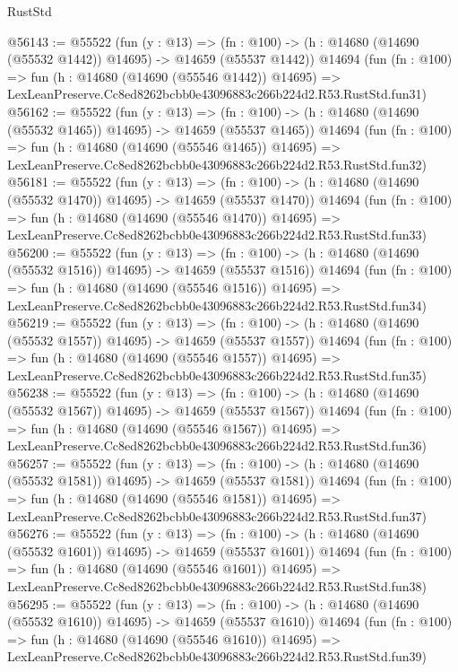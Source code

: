 \begin{lexlean}{RustStd}
\begin{coremodule}
@56143 := @55522
    (fun (y : @13) =>
    (fn : @100) -> (h : @14680 (@14690 (@55532 @1442)) @14695) -> @14659 (@55537 @1442))
    @14694
    (fun (fn : @100) =>
    fun (h : @14680 (@14690 (@55546 @1442)) @14695) =>
    LexLeanPreserve.Cc8ed8262bcbb0e43096883c266b224d2.R53.RustStd.fun31)
@56162 := @55522
    (fun (y : @13) =>
    (fn : @100) -> (h : @14680 (@14690 (@55532 @1465)) @14695) -> @14659 (@55537 @1465))
    @14694
    (fun (fn : @100) =>
    fun (h : @14680 (@14690 (@55546 @1465)) @14695) =>
    LexLeanPreserve.Cc8ed8262bcbb0e43096883c266b224d2.R53.RustStd.fun32)
@56181 := @55522
    (fun (y : @13) =>
    (fn : @100) -> (h : @14680 (@14690 (@55532 @1470)) @14695) -> @14659 (@55537 @1470))
    @14694
    (fun (fn : @100) =>
    fun (h : @14680 (@14690 (@55546 @1470)) @14695) =>
    LexLeanPreserve.Cc8ed8262bcbb0e43096883c266b224d2.R53.RustStd.fun33)
@56200 := @55522
    (fun (y : @13) =>
    (fn : @100) -> (h : @14680 (@14690 (@55532 @1516)) @14695) -> @14659 (@55537 @1516))
    @14694
    (fun (fn : @100) =>
    fun (h : @14680 (@14690 (@55546 @1516)) @14695) =>
    LexLeanPreserve.Cc8ed8262bcbb0e43096883c266b224d2.R53.RustStd.fun34)
@56219 := @55522
    (fun (y : @13) =>
    (fn : @100) -> (h : @14680 (@14690 (@55532 @1557)) @14695) -> @14659 (@55537 @1557))
    @14694
    (fun (fn : @100) =>
    fun (h : @14680 (@14690 (@55546 @1557)) @14695) =>
    LexLeanPreserve.Cc8ed8262bcbb0e43096883c266b224d2.R53.RustStd.fun35)
@56238 := @55522
    (fun (y : @13) =>
    (fn : @100) -> (h : @14680 (@14690 (@55532 @1567)) @14695) -> @14659 (@55537 @1567))
    @14694
    (fun (fn : @100) =>
    fun (h : @14680 (@14690 (@55546 @1567)) @14695) =>
    LexLeanPreserve.Cc8ed8262bcbb0e43096883c266b224d2.R53.RustStd.fun36)
@56257 := @55522
    (fun (y : @13) =>
    (fn : @100) -> (h : @14680 (@14690 (@55532 @1581)) @14695) -> @14659 (@55537 @1581))
    @14694
    (fun (fn : @100) =>
    fun (h : @14680 (@14690 (@55546 @1581)) @14695) =>
    LexLeanPreserve.Cc8ed8262bcbb0e43096883c266b224d2.R53.RustStd.fun37)
@56276 := @55522
    (fun (y : @13) =>
    (fn : @100) -> (h : @14680 (@14690 (@55532 @1601)) @14695) -> @14659 (@55537 @1601))
    @14694
    (fun (fn : @100) =>
    fun (h : @14680 (@14690 (@55546 @1601)) @14695) =>
    LexLeanPreserve.Cc8ed8262bcbb0e43096883c266b224d2.R53.RustStd.fun38)
@56295 := @55522
    (fun (y : @13) =>
    (fn : @100) -> (h : @14680 (@14690 (@55532 @1610)) @14695) -> @14659 (@55537 @1610))
    @14694
    (fun (fn : @100) =>
    fun (h : @14680 (@14690 (@55546 @1610)) @14695) =>
    LexLeanPreserve.Cc8ed8262bcbb0e43096883c266b224d2.R53.RustStd.fun39)

\end{coremodule}
\end{lexlean}
